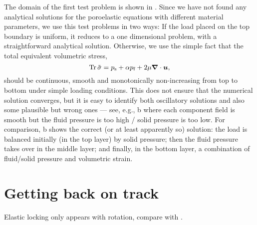 The domain of the first test problem is shown in .
Since we have not found any analytical solutions for the poroelastic equations
with different material parameters, we use this test problems in two ways: If
the load placed on the top boundary is uniform, it reduces to a one dimensional
problem, with a straightforward analytical solution.
Otherwise, we use the simple fact that the total equivalent volumetric stress,
\begin{equation}
\trace{\tilde{\sigma}} = \Ps + \alpha \Pf + 2\mu \nabla\cdot\U,
\end{equation}
should be continuous, smooth and monotonically non-increasing from top to bottom
under simple loading conditions.
This does not ensure that the numerical solution converges, but it is easy to
identify both oscillatory solutions and also some plausible but wrong ones
--- see, e.g., b where each component field is smooth
but the fluid pressure is too high / solid pressure is too low.
For comparison, b shows the correct (or at least
apparently so) solution: the load is balanced initially (in the top layer) by
solid pressure; then the fluid pressure takes over in the middle layer; and
finally, in the bottom layer, a combination of fluid/solid pressure and
volumetric strain.





\section{Getting back on track}


Elastic locking only appears with rotation, compare 
with .

